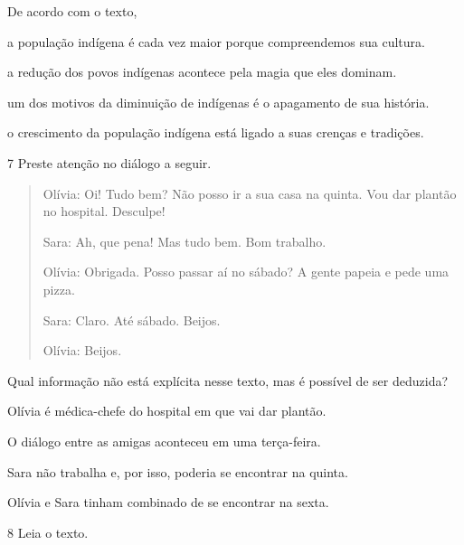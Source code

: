 De acordo com o texto,

\begin{escolha}
\item a população indígena é cada vez maior porque compreendemos sua cultura.

\item a redução dos povos indígenas acontece pela magia que eles dominam.

\item um dos motivos da diminuição de indígenas é o apagamento de sua história.

\item o crescimento da população indígena está ligado a suas crenças e tradições.
\end{escolha}


\num{7} Preste atenção no diálogo a seguir.

\begin{quote}
Olívia: Oi! Tudo bem? Não posso ir a sua casa na quinta. Vou dar plantão
no hospital. Desculpe!

Sara: Ah, que pena! Mas tudo bem. Bom trabalho.

Olívia: Obrigada. Posso passar aí no sábado? A gente papeia e pede uma
pizza.

Sara: Claro. Até sábado. Beijos.

Olívia: Beijos.

\end{quote}

Qual informação não está explícita nesse texto, mas é possível de ser
deduzida?

\begin{escolha}
\item Olívia é médica-chefe do hospital em que vai dar plantão.

\item O diálogo entre as amigas aconteceu em uma terça-feira.

\item Sara não trabalha e, por isso, poderia se encontrar na quinta.

\item Olívia e Sara tinham combinado de se encontrar na sexta.
\end{escolha}


\pagebreak
\num{8} Leia o texto.


